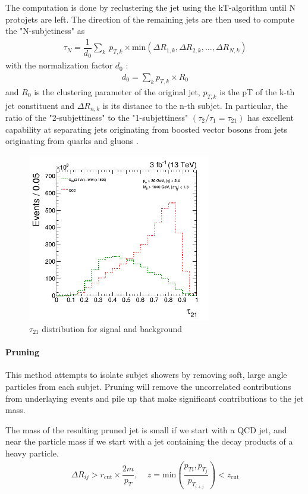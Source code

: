 The computation is done by reclustering the jet using the kT-algorithm until N protojets are left. The direction of the remaining jets are then used to compute the "N-subjetiness" as
\begin{eqnarray}
\tau_{N}=\dfrac{1}{d_{0}} \sum_{k}\: p_{T,k}\times \text{min}\left( \Delta R_{1,k}, \Delta R_{2,k},\dots,\Delta R_{N,k}\right) 
\end{eqnarray}
with the normalization factor $d_{0}$ :
\begin{eqnarray}
d_{0} = \sum_{k} p_{T,k}\times R_{0}
\end{eqnarray}
and $R_{0}$ is the clustering parameter of the original jet, $p_{ T,k}$ is the pT of the k-th jet constituent and $\Delta R_{n,k}$ is its distance to the n-th subjet. In particular, the ratio of the "2-subjettiness" to the "1-subjettiness" $(\tau_{2} / \tau_{1} = \tau_{21} )$ has excellent capability at separating jets originating from boosted vector bosons from jets originating from quarks and gluons \cite{subjetiness}.
\begin{figure}[H]
  \centering
\includegraphics[width=8cm]{physics_objects_plots/tau21}
\caption{$\tau_{21}$ distribution for signal and background \label{jettau21figure}}
\end{figure}

\paragraph{Pruning}\label{prun}
This method \cite{pruning} attempts to isolate subjet showers by removing soft, large angle particles from each subjet. Pruning will remove the uncorrelated contributions from underlaying events and pile up that make significant contributions to the jet mass.

The mass of the resulting pruned jet is small if we start with a QCD jet, and near the particle mass if we start with a jet containing the decay products of a heavy particle. 
\begin{eqnarray}
\Delta R_{ij}> r_{\text{cut}}\times\dfrac{2m}{p_{T}},\ \ \  \ \  z=\text{min}\left( \dfrac{p_{Ti}, p_{T_{j}}}{p_{T_{i+j}}} \right) < z_{\text{cut}}  
\end{eqnarray}

